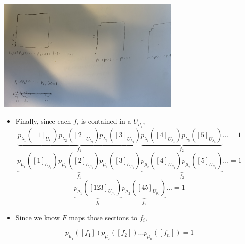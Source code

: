\documentclass[8pt]{beamer}
\begin{document}
\begin{frame}
\begin{columns}
\begin{column}[T]{0.5\textwidth}
\begin{itemize}
        \end{itemize}
      \end{column}
      \begin{column}[T]{0.5\textwidth}
            \begin{center}
              \includegraphics[width=0.7\textwidth]{img/proof-pt2-ending.JPG}
            \end{center}
        \begin{itemize}
          \item
            Finally, since each $f_i$ is contained in a $U_{\mu_i}$,
            \[\underbrace{p_{\lambda_1}([1]_{U_{\lambda_1}})p_{\lambda_2}([2]_{U_{\lambda_2}})p_{\lambda_3}([3]_{U_{\lambda_3}})}_{f_1} \underbrace{p_{\lambda_4}([4]_{U_{\lambda_4}})p_{\lambda_5}([5]_{U_{\lambda_5}})}_{f_2} ... = 1\]
            \[\underbrace{p_{\mu_1}([1]_{U_{\mu_1}})p_{\mu_1}([2]_{U_{\mu_1}})p_{\mu_1}([3]_{U_{\mu_1}})}_{f_1} \underbrace{p_{\mu_2}([4]_{U_{\mu_2}})p_{\mu_2}([5]_{U_{\mu_2}})}_{f_2} ... = 1\]
            \[\underbrace{p_{\mu_1}([123]_{U_{\mu_1}})}_{f_1} \underbrace{p_{\mu_2}([45]_{U_{\mu_2}})}_{f_2} ... = 1\]
          \item Since we know $F$ maps those sections to $f_i$,

            \[p_{\mu_1}([f_1])p_{\mu_2}([f_2]) ... p_{\mu_n}([f_n]) = 1\]
        \end{itemize}
      \end{column}
    \end{columns}
  \end{frame}
\end{document}
